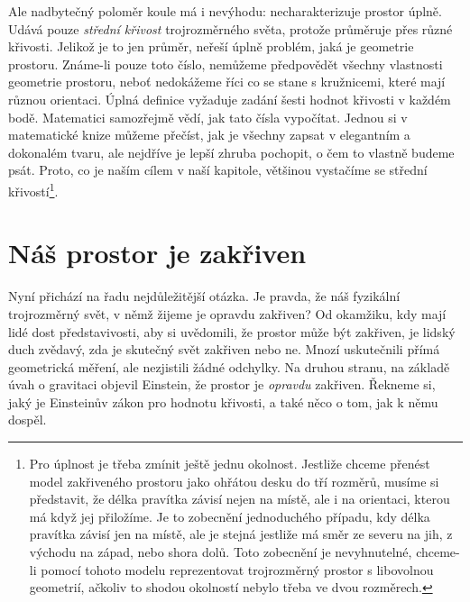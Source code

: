 {    Ale nadbytečný poloměr koule má i nevýhodu: necharakterizuje prostor úplně. Udává pouze 
    \emph{střední křivost} trojrozměrného světa, protože průměruje přes různé křivosti. Jelikož je 
    to jen průměr, neřeší úplně problém, jaká je geometrie prostoru. Známe-li pouze toto číslo, 
    nemůžeme předpovědět všechny vlastnosti geometrie prostoru, neboť nedokážeme říci co se stane s 
    kružnicemi, které mají různou orientaci. Úplná definice vyžaduje zadání šesti hodnot křivosti v 
    každém bodě. Matematici samozřejmě vědí, jak tato čísla vypočítat. Jednou si v matematické 
    knize můžeme přečíst, jak je všechny zapsat v elegantním a dokonalém tvaru, ale nejdříve je 
    lepší zhruba pochopit, o čem to vlastně budeme psát. Proto, co je naším cílem v naší kapitole, 
    většinou vystačíme se střední křivostí\footnote{Pro úplnost je třeba zmínit ještě jednu 
    okolnost. Jestliže chceme přenést model zakřiveného prostoru jako ohřátou desku do tří rozměrů, 
    musíme si představit, že délka pravítka závisí nejen na místě, ale i na orientaci, kterou má 
    když jej přiložíme. Je to zobecnění jednoduchého případu, kdy délka pravítka závisí jen na 
    místě, ale je stejná jestliže má směr ze severu na jih, z východu na západ, nebo shora dolů. 
    Toto zobecnění je nevyhnutelné, chceme-li pomocí tohoto modelu reprezentovat trojrozměrný 
    prostor s libovolnou geometrií, ačkoliv to shodou okolností nebylo třeba ve dvou rozměrech.}.

  \section{Náš prostor je zakřiven}\label{fyz:IIchapXLIIsecIII}
    Nyní přichází na řadu nejdůležitější otázka. Je pravda, že náš fyzikální trojrozměrný svět, v 
    němž žijeme je opravdu zakřiven? Od okamžiku, kdy mají lidé dost představivosti, aby si 
    uvědomili, že prostor může být zakřiven, je lidský duch zvědavý, zda je skutečný svět zakřiven 
    nebo ne. Mnozí uskutečnili přímá geometrická měření, ale nezjistili žádné odchylky. Na druhou 
    stranu, na základě úvah o gravitaci objevil Einstein, že prostor je \emph{opravdu} zakřiven. 
    Řekneme si, jaký je Einsteinův zákon pro hodnotu křivosti, a také něco o tom, jak k němu dospěl.
    
}
